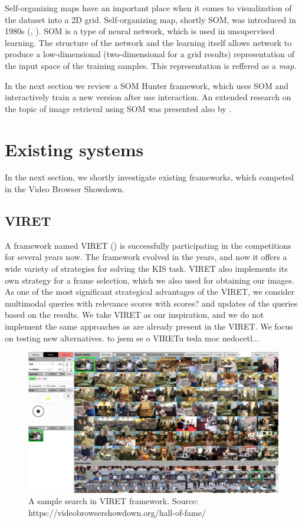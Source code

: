 Self-organizing maps have an important place when it comes to visualization of the dataset into a 2D grid. Self-organizing map, shortly SOM, was introduced in 1980s (\cite{kohonen1982self}, \cite{kohonen2007kohonen}). SOM is a type of neural network, which is used in unsupervised learning. The structure of the network and the learning itself allows network to produce a low-dimensional (two-dimensional for a grid results) representation of the input space of the training samples. This representation is reffered as a \emph{map}.

In the next section we review a SOM Hunter framework, which uses SOM and interactively train a new version after use interaction. An extended research on the topic of image retrieval using SOM was presented also by \cite{koskela2003interactive}.

\section{Existing systems}

In the next section, we shortly investigate existing frameworks, which competed in the Video Browser Showdown.

\subsection{VIRET}

A framework named VIRET (\cite{lokovc2019framework, lokovc2019viret}) is successfully participating in the competitions for several years now. The framework evolved in the years, and now it offers a wide variety of strategies for solving the KIS task. VIRET also implements its own strategy for a frame selection, which we also used for obtaining our images. As one of the most significant strategical advantages of the VIRET, we consider multimodal queries with relevance scores {\color{red} with scores?} and updates of the queries based on the results. We take VIRET as our inspiration, and we do not implement the same approaches as are already present in the VIRET. We focus on testing new alternatives. {\color{red} to jsem se o VIRETu teda moc nedocetl...}

\begin{figure}
    \centering
    \includegraphics{img/viret_small.png}
    \caption{A sample search in VIRET framework. Source: https://videobrowsershowdown.org/hall-of-fame/}
    \label{fig:viret}
\end{figure}

